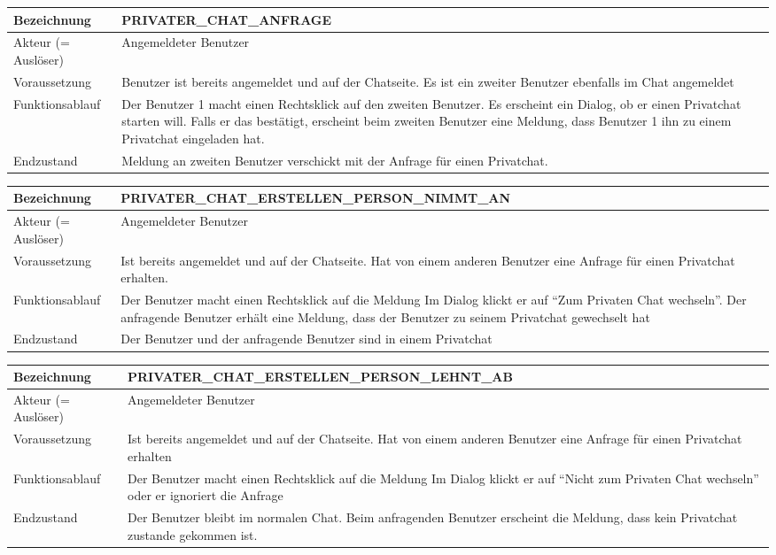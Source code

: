 \documentclass[12pt]{article}
\newcommand{\requirementTable}[5]{
    \begin{table}[H]
      \begin{tabularx}{\textwidth}{|l|X|}
        \hline
        Bezeichnung & #1  \\ \hline
        Akteur (= Auslöser) & #2  \\ \hline
        Voraussetzung & #3  \\ \hline
        Funktionsablauf & #4  \\ \hline
        Endzustand & #5  \\ \hline
      \end{tabularx}
    \end{table}
}
\begin{document}
        \requirementTable
            {PRIVATER\_CHAT\_ANFRAGE}
            {Angemeldeter Benutzer}
            {
            Benutzer ist bereits angemeldet und auf der Chatseite. \newline
            Es ist ein zweiter Benutzer ebenfalls im Chat angemeldet
            }
            {
            Der Benutzer 1 macht einen Rechtsklick auf den zweiten Benutzer. \newline
            Es erscheint ein Dialog, ob er einen Privatchat starten will. \newline
            Falls er das bestätigt, erscheint beim zweiten Benutzer eine Meldung, dass Benutzer 1 ihn zu einem Privatchat eingeladen hat.
            }
            {Meldung an zweiten Benutzer verschickt mit der Anfrage für einen Privatchat.}


        \requirementTable
            {PRIVATER\_CHAT\_ERSTELLEN\_PERSON\_\newline NIMMT\_AN }
            {Angemeldeter Benutzer}
            {
            Ist bereits angemeldet und auf der Chatseite. \newline
            Hat von einem anderen Benutzer eine Anfrage für einen Privatchat erhalten.}
            {
            Der Benutzer macht einen Rechtsklick auf die Meldung Im Dialog klickt er auf “Zum Privaten Chat wechseln”. \newline
            Der anfragende Benutzer erhält eine Meldung, dass der Benutzer zu seinem Privatchat gewechselt hat
            }
            {Der Benutzer und der anfragende Benutzer sind in einem Privatchat}


        \requirementTable
            {PRIVATER\_CHAT\_ERSTELLEN\_PERSON\_\newline LEHNT\_AB}
            {Angemeldeter Benutzer}
            {
            Ist bereits angemeldet und auf der Chatseite. \newline
            Hat von einem anderen Benutzer eine Anfrage für einen Privatchat erhalten
            }
            {
            Der Benutzer macht einen Rechtsklick auf die Meldung Im Dialog klickt er auf “Nicht zum Privaten Chat wechseln”\newline
            oder er ignoriert die Anfrage
            }
            {
            Der Benutzer bleibt im normalen Chat. \newline
            Beim anfragenden Benutzer erscheint die Meldung, dass kein Privatchat zustande gekommen ist.
            }
\end{document}

